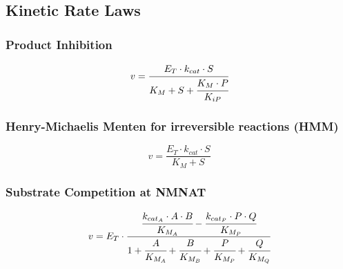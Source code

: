 \documentclass[a4paper,10pt]{article}
\begin{document}
\subsection*{Kinetic Rate Laws}


\subsubsection*{Product Inhibition}
\begin{equation}
v=\cfrac{E_T\cdot k_{cat}\cdot S}{K_M + S + \cfrac{K_M\cdot P}{K_{iP}} }
\end{equation}


\subsubsection*{Henry-Michaelis Menten for irreversible reactions (HMM)}
\begin{equation}
v=\frac{E_T\cdot k_{cat}\cdot S}{K_M + S}
\end{equation}


\subsubsection*{Substrate Competition at NMNAT}
\begin{equation}
v=E_T \cdot \cfrac{\cfrac{k_{{cat}_{A}}\cdot A \cdot
B}{K_{{M}_A}}-\cfrac{k_{{cat}_{P}}\cdot P \cdot
Q}{K_{{M}_P}}}{1+\cfrac{A}{K_{{M}_A}}+\cfrac{B}{K_{{M}_B}}+\cfrac{P}{K_{{M}_P}}+\cfrac{Q}{K_{{M}_Q}}}
\end{equation}





\end{document}
